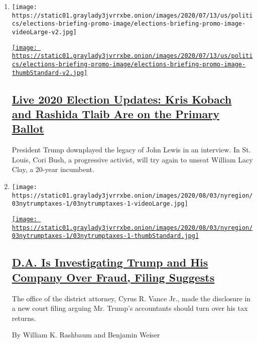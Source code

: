 \begin{enumerate}
\def\labelenumi{\arabic{enumi}.}
\item
  \texttt{[image: https://static01.graylady3jvrrxbe.onion/images/2020/07/13/us/politics/elections-briefing-promo-image/elections-briefing-promo-image-videoLarge-v2.jpg]}

  \href{/2020/08/04/us/elections/primary-election-michigan-arizona-kansas.html}{\texttt{[image: https://static01.graylady3jvrrxbe.onion/images/2020/07/13/us/politics/elections-briefing-promo-image/elections-briefing-promo-image-thumbStandard-v2.jpg]}}

  \hypertarget{live-2020-election-updates-kris-kobach-and-rashida-tlaib-are-on-the-primary-ballot}{%
  \subsection{\texorpdfstring{\href{/2020/08/04/us/elections/primary-election-michigan-arizona-kansas.html}{Live
  2020 Election Updates: Kris Kobach and Rashida Tlaib Are on the
  Primary
  Ballot}}{Live 2020 Election Updates: Kris Kobach and Rashida Tlaib Are on the Primary Ballot}}\label{live-2020-election-updates-kris-kobach-and-rashida-tlaib-are-on-the-primary-ballot}}

  President Trump downplayed the legacy of John Lewis in an interview.
  In St. Louis, Cori Bush, a progressive activist, will try again to
  unseat William Lacy Clay, a 20-year incumbent.
\item
  \texttt{[image: https://static01.graylady3jvrrxbe.onion/images/2020/08/03/nyregion/03nytrumptaxes-1/03nytrumptaxes-1-videoLarge.jpg]}

  \href{/2020/08/03/nyregion/donald-trump-taxes-cyrus-vance.html}{\texttt{[image: https://static01.graylady3jvrrxbe.onion/images/2020/08/03/nyregion/03nytrumptaxes-1/03nytrumptaxes-1-thumbStandard.jpg]}}

  \hypertarget{da-is-investigating-trump-and-his-company-over-fraud-filing-suggests}{%
  \subsection{\texorpdfstring{\href{/2020/08/03/nyregion/donald-trump-taxes-cyrus-vance.html}{D.A.
  Is Investigating Trump and His Company Over Fraud, Filing
  Suggests}}{D.A. Is Investigating Trump and His Company Over Fraud, Filing Suggests}}\label{da-is-investigating-trump-and-his-company-over-fraud-filing-suggests}}

  The office of the district attorney, Cyrus R. Vance Jr., made the
  disclosure in a new court filing arguing Mr. Trump's accountants
  should turn over his tax returns.

  By William K. Rashbaum and Benjamin Weiser
\end{enumerate}

